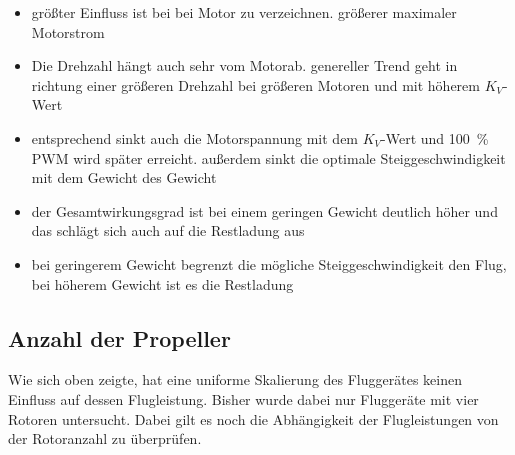 \begin{itemize}
	\item größter Einfluss ist bei bei Motor zu verzeichnen. größerer maximaler Motorstrom
	\item Die Drehzahl hängt auch sehr vom Motorab. genereller Trend geht in richtung einer größeren Drehzahl bei größeren Motoren und mit höherem \ensuremath{K_V}-Wert
	\item entsprechend sinkt auch die Motorspannung mit dem \ensuremath{K_V}-Wert und \SI{100}{\%} PWM wird später erreicht. außerdem sinkt die optimale Steiggeschwindigkeit mit dem Gewicht des Gewicht
	\item der Gesamtwirkungsgrad ist bei einem geringen Gewicht deutlich höher und das schlägt sich auch auf die Restladung aus
	\item bei geringerem Gewicht begrenzt die mögliche Steiggeschwindigkeit den Flug, bei höherem Gewicht ist es die Restladung 
\end{itemize}

\subsection{Anzahl der Propeller}
Wie sich oben zeigte, hat eine uniforme Skalierung des Fluggerätes keinen Einfluss auf dessen Flugleistung. Bisher wurde dabei nur Fluggeräte mit vier Rotoren untersucht. Dabei gilt es noch die Abhängigkeit der Flugleistungen von der Rotoranzahl zu überprüfen. 

